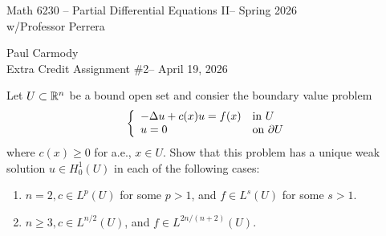 \documentclass[12pt,a4paper]{report}
\newcommand{\CLASSNAME}{Math 6230 -- Partial Differential Equations II}
\newcommand{\STUDENTNAME}{Paul Carmody}
\newcommand{\ASSIGNMENT}{Extra Credit Assignment \#2}
\newcommand{\DUEDATE}{April 19, 2026}
\newcommand{\PROFESSOR}{Professor Perrera}
\newcommand{\SEMESTER}{Spring 2026}
\begin{document}
\begin{center}
	\Large{\CLASSNAME -- \SEMESTER} \\
	\large{ w/\PROFESSOR}
\end{center}
\begin{center}
	\STUDENTNAME \\
	\ASSIGNMENT -- \DUEDATE\\
\end{center} 

Let $U \subset \mathbb{R}^n$ be a bound open set and consier the boundary value problem
\begin{align*}
		\left \{ \begin{array}{ll} -\Delta u + c(x)u = f(x) & \text{in } U\\ 
		u=0 & \text{on } \partial U \end{array} \right .
\end{align*} where $c(x) \ge 0$ for a.e., $x \in U$.  Show that this problem has a unique weak solution $u\in H_0^1(U)$ in each of the following cases:
\begin{enumerate}[label=(\roman*)]
	\item $n=2, c \in L^p(U)$ for some $p>1$, and $f \in L^s(U)$ for some $s >1$.
	\item $n\ge 3, c\in L^{n/2}(U)$, and $f \in L^{2n/(n+2)}(U)$.
\end{enumerate}

\HLINE
\end{document}
